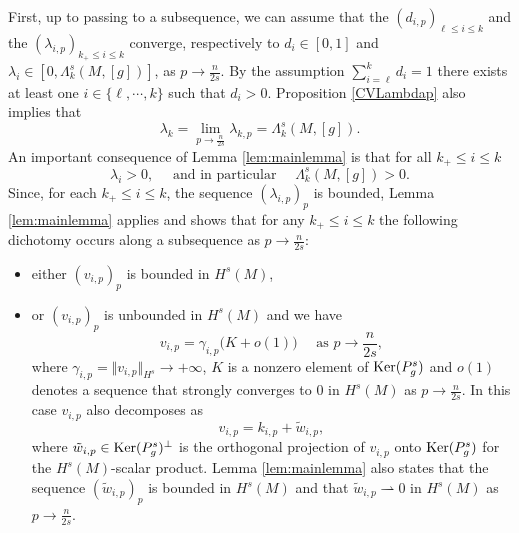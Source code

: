 \documentclass[10pt]{amsart}
\numberwithin{equation}{section}
\def\La{{\Lambda}}
\def\la{{\lambda}}
\def\ker{{\mathop{\rm Ker}}}
\theoremstyle{plain}
\theoremstyle{remark}
\begin{document}
First, up to passing to a subsequence, we can assume that the $(d_{i,p})_{\ell \le i \le k}$ and the $(\la_{i,p})_{k_+ \le i \le k}$ converge, respectively to $d_i \in [0,1]$ and $\la_i  \in [0,\La_k^s(M,[g])]$, as $p \to \frac{n}{2s}$. By the assumption $\sum_{i=\ell}^k d_i = 1$ there exists at least one $i \in \{\ell, \cdots, k \}$ such that $d_i >0$. Proposition \ref{CVLambdap} also implies that 
\begin{equation} \label{cvlambdalimite}
\la_k= \lim_{p \to \frac{n}{2s}} \la_{k,p} =  \La_k^s(M,[g]).
\end{equation}
An important consequence of Lemma \ref{lem:mainlemma} is that for all $k_+ \le i \le k$
\begin{equation} \label{lai>0}
 \la_i>0, \quad \text{ and in particular }  \quad \La_k^s(M,[g]) >0.
\end{equation}
 Since, for each $k_+ \le i \le k$, the sequence $(\lambda_{i,p})_{p}$ is bounded, Lemma \ref{lem:mainlemma} applies and shows that for any $k_+ \le i \le k$ the following dichotomy occurs along a subsequence as $p \to \frac{n}{2s}$:
\begin{itemize}
 \item either $(v_{i,p})_p$ is bounded in $H^s(M)$, 
 \item or $(v_{i,p})_p$ is unbounded in $H^s(M)$  and we have
 \begin{equation} \label{mainthp:4}
  v_{i,p} = \gamma_{i,p} \big(K + o(1) \big) \quad \text{ as } p \to \frac{n}{2s},
  \end{equation}
  where $\gamma_{i,p} = \Vert v_{i,p} \Vert_{H^s} \to + \infty$, $K$ is a nonzero element of $\ker(P_g^s)$ and $o(1)$ denotes a sequence that strongly converges to $0$ in $H^s(M)$ as $p \to \frac{n}{2s}$. In this case $v_{i,p}$ also  decomposes as 
\begin{equation} \label{starstar}
 v_{i,p} = k_{i,p} + \tilde{w}_{i,p}, 
 \end{equation}
where $\tilde{w}_{i,p} \in \ker(P_g^s)^{\perp}$ is the orthogonal projection of $v_{i,p}$ onto $\ker(P_g^s)$ for the $H^s(M)$-scalar product. Lemma \ref{lem:mainlemma} also states that the sequence $(\tilde{w}_{i,p})_p$ is bounded in $H^s(M)$  and  that $\tilde{w}_{i,p} \rightharpoonup 0$ in $H^s(M)$  as $p \to \frac{n}{2s}$.
\end{itemize}

\medskip
\end{document}
